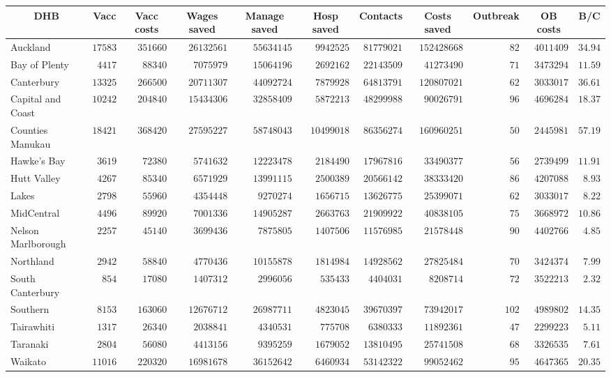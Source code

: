 \documentclass{article}
\begin{document}
\begin{table}\small
\begin{center}
\begin{tabular}{lrrrrrrrrrr}
\hline\hline
\multicolumn{1}{c}{DHB}&\multicolumn{1}{c}{Vacc}&\multicolumn{1}{c}{Vacc costs}&\multicolumn{1}{c}{Wages saved}&\multicolumn{1}{c}{Manage saved}&\multicolumn{1}{c}{Hosp saved}&\multicolumn{1}{c}{Contacts}&\multicolumn{1}{c}{Costs saved}&\multicolumn{1}{c}{Outbreak}&\multicolumn{1}{c}{OB costs}&\multicolumn{1}{c}{B/C}\tabularnewline
\hline
Auckland&$17583$&$351660$&$26132561$&$55634145$&$ 9942525$&$81779021$&$152428668$&$ 82$&$4011409$&$34.94$\tabularnewline
Bay of Plenty&$ 4417$&$ 88340$&$ 7075979$&$15064196$&$ 2692162$&$22143509$&$ 41273490$&$ 71$&$3473294$&$11.59$\tabularnewline
Canterbury&$13325$&$266500$&$20711307$&$44092724$&$ 7879928$&$64813791$&$120807021$&$ 62$&$3033017$&$36.61$\tabularnewline
Capital and Coast&$10242$&$204840$&$15434306$&$32858409$&$ 5872213$&$48299988$&$ 90026791$&$ 96$&$4696284$&$18.37$\tabularnewline
Counties Manukau&$18421$&$368420$&$27595227$&$58748043$&$10499018$&$86356274$&$160960251$&$ 50$&$2445981$&$57.19$\tabularnewline
Hawke's Bay&$ 3619$&$ 72380$&$ 5741632$&$12223478$&$ 2184490$&$17967816$&$ 33490377$&$ 56$&$2739499$&$11.91$\tabularnewline
Hutt Valley&$ 4267$&$ 85340$&$ 6571929$&$13991115$&$ 2500389$&$20566142$&$ 38333420$&$ 86$&$4207088$&$ 8.93$\tabularnewline
Lakes&$ 2798$&$ 55960$&$ 4354448$&$ 9270274$&$ 1656715$&$13626775$&$ 25399071$&$ 62$&$3033017$&$ 8.22$\tabularnewline
MidCentral&$ 4496$&$ 89920$&$ 7001336$&$14905287$&$ 2663763$&$21909922$&$ 40838105$&$ 75$&$3668972$&$10.86$\tabularnewline
Nelson Marlborough&$ 2257$&$ 45140$&$ 3699436$&$ 7875805$&$ 1407506$&$11576985$&$ 21578448$&$ 90$&$4402766$&$ 4.85$\tabularnewline
Northland&$ 2942$&$ 58840$&$ 4770436$&$10155878$&$ 1814984$&$14928562$&$ 27825484$&$ 70$&$3424374$&$ 7.99$\tabularnewline
South Canterbury&$  854$&$ 17080$&$ 1407312$&$ 2996056$&$  535433$&$ 4404031$&$  8208714$&$ 72$&$3522213$&$ 2.32$\tabularnewline
Southern&$ 8153$&$163060$&$12676712$&$26987711$&$ 4823045$&$39670397$&$ 73942017$&$102$&$4989802$&$14.35$\tabularnewline
Tairawhiti&$ 1317$&$ 26340$&$ 2038841$&$ 4340531$&$  775708$&$ 6380333$&$ 11892361$&$ 47$&$2299223$&$ 5.11$\tabularnewline
Taranaki&$ 2804$&$ 56080$&$ 4413156$&$ 9395259$&$ 1679052$&$13810495$&$ 25741508$&$ 68$&$3326535$&$ 7.61$\tabularnewline
Waikato&$11016$&$220320$&$16981678$&$36152642$&$ 6460934$&$53142322$&$ 99052462$&$ 95$&$4647365$&$20.35$\tabularnewline

\end{tabular}
\end{center}
\end{table}
\end{document}
